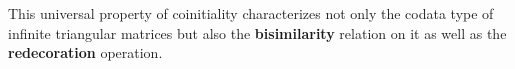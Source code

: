\documentclass{llncs}
\newcommand{\fat}[1]{\textbf{#1}}
\begin{document}
% 
% 
% 
% 
% 
% 
% 
% 
% 
% 
% 
% 
% 
% 
% 
% 
% 
% 
%   
%    
%    
% 
%    
% 
% 
This universal property of coinitiality characterizes not only the codata type of infinite triangular matrices but also
the \fat{bisimilarity} relation on it as well as the \fat{redecoration} operation.
 
\end{document}
